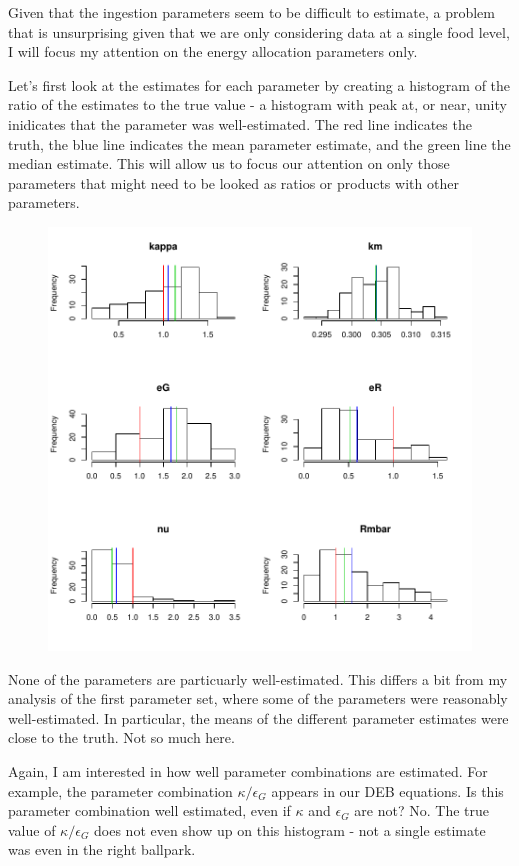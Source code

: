 \documentclass[12pt,reqno,final]{amsart}
\theoremstyle{plain}
\numberwithin{equation}{part}
\begin{document}
Given that the ingestion parameters seem to be difficult to estimate,
a problem that is unsurprising given that we are only considering data
at a single food level, I will focus my attention on the energy
allocation parameters only.

Let's first look at the estimates for each parameter by creating a
histogram of the ratio of the estimates to the true value - a
histogram with peak at, or near, unity inidicates that the parameter
was well-estimated. The red line indicates the truth, the blue line
indicates the mean parameter estimate, and the green line the median
estimate. This will allow us to focus our attention on only those
parameters that might need to be looked as ratios or products with
other parameters.
\begin{figure}
\includegraphics{Solving_the_problem_of_parameter_covariation_3-003}
\end{figure}

None of the parameters are particuarly well-estimated. This differs a
bit from my analysis of the first parameter set, where some of the
parameters were reasonably well-estimated. In particular, the means of
the different parameter estimates were close to the truth. Not so much
here.

Again, I am interested in how well parameter combinations are
estimated. For example, the parameter combination $\kappa/\epsilon_G$
appears in our DEB equations. Is this parameter combination well
estimated, even if $\kappa$ and $\epsilon_G$ are not? No. The true
value of $\kappa/\epsilon_G$ does not even show up on this histogram -
not a single estimate was even in the right ballpark.
\end{document}
